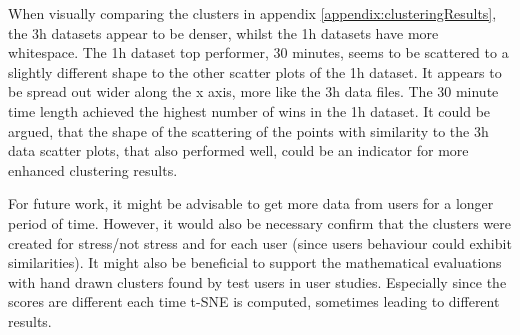 When visually comparing the clusters in appendix \ref{appendix:clusteringResults}, the 3h datasets appear to be denser, whilst the 1h datasets have more whitespace. The 1h dataset top performer, 30 minutes, seems to be scattered to a slightly different shape to the other scatter plots of the 1h dataset. It appears to be spread out wider along the x axis, more like the 3h data files. The 30 minute time length achieved the highest number of wins in the 1h dataset. It could be argued, that the shape of the scattering of the points with similarity to the 3h data scatter plots, that also performed well, could be an indicator for more enhanced clustering results.



For future work, it might be advisable to get more data from users for a longer period of time. However, it would also be necessary confirm that the clusters were created for stress/not stress and for each user (since users behaviour could exhibit similarities). It might also be beneficial to support the mathematical evaluations with hand drawn clusters found by test users in user studies. Especially since the scores are different each time t-SNE is computed, sometimes leading to different results.





 









